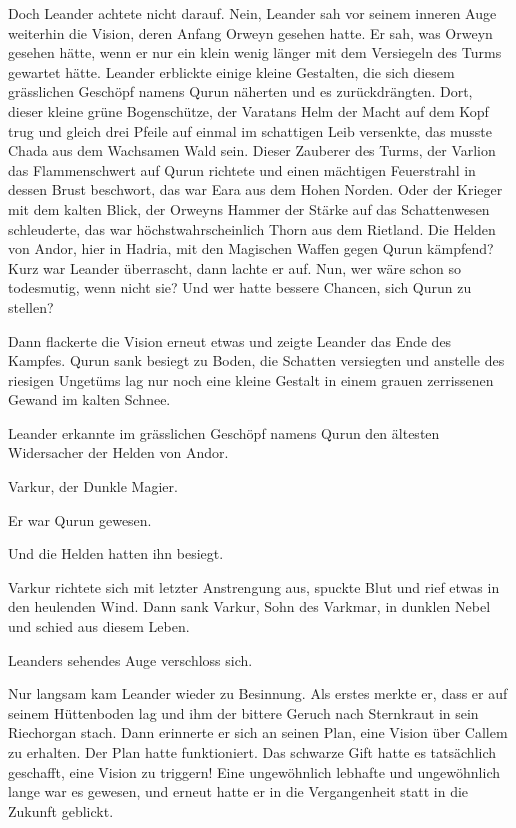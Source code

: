Doch Leander achtete nicht darauf. Nein, Leander sah vor seinem inneren Auge weiterhin die Vision, deren Anfang Orweyn gesehen hatte. Er sah, was Orweyn gesehen hätte, wenn er nur ein klein wenig länger mit dem Versiegeln des Turms gewartet hätte. Leander erblickte einige kleine Gestalten, die sich diesem grässlichen Geschöpf namens Qurun näherten und es zurückdrängten. Dort, dieser kleine grüne Bogenschütze, der Varatans Helm der Macht auf dem Kopf trug und gleich drei Pfeile auf einmal im schattigen Leib versenkte, das musste Chada aus dem Wachsamen Wald sein. Dieser Zauberer des Turms, der Varlion das Flammenschwert auf Qurun richtete und einen mächtigen Feuerstrahl in dessen Brust beschwort, das war Eara aus dem Hohen Norden. Oder der Krieger mit dem kalten Blick, der Orweyns Hammer der Stärke auf das Schattenwesen schleuderte, das war höchstwahrscheinlich Thorn aus dem Rietland. Die Helden von Andor, hier in Hadria, mit den Magischen Waffen gegen Qurun kämpfend? Kurz war Leander überrascht, dann lachte er auf. Nun, wer wäre schon so todesmutig, wenn nicht sie? Und wer hatte bessere Chancen, sich Qurun zu stellen?

Dann flackerte die Vision erneut etwas und zeigte Leander das Ende des Kampfes. Qurun sank besiegt zu Boden, die Schatten versiegten und anstelle des riesigen Ungetüms lag nur noch eine kleine Gestalt in einem grauen zerrissenen Gewand im kalten Schnee.

Leander erkannte im grässlichen Geschöpf namens Qurun den ältesten Widersacher der Helden von Andor.

Varkur, der Dunkle Magier.

Er war Qurun gewesen.

Und die Helden hatten ihn besiegt.

Varkur richtete sich mit letzter Anstrengung aus, spuckte Blut und rief etwas in den heulenden Wind. Dann sank Varkur, Sohn des Varkmar, in dunklen Nebel und schied aus diesem Leben.

Leanders sehendes Auge verschloss sich.\bigskip







Nur langsam kam Leander wieder zu Besinnung. Als erstes merkte er, dass er auf seinem Hüttenboden lag und ihm der bittere Geruch nach Sternkraut in sein Riechorgan stach. Dann erinnerte er sich an seinen Plan, eine Vision über Callem zu erhalten. Der Plan hatte funktioniert. Das schwarze Gift hatte es tatsächlich geschafft, eine Vision zu triggern! Eine ungewöhnlich lebhafte und ungewöhnlich lange war es gewesen, und erneut hatte er in die Vergangenheit statt in die Zukunft geblickt.


